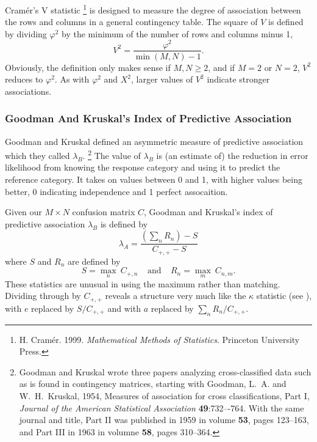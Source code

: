 Cramér's V statistic%
%
\footnote{H. Cramér. 1999. {\it Mathematical Methods of
    Statistics}. Princeton University Press.}
%
is designed to measure the degree of association between the
rows and columns in a general contingency table.   The square of
$V$ is defined by dividing $\varphi^2$ by the minimum of the number
of rows and columns minus 1,
%
\begin{equation}
V^2 = \frac{\varphi^2}{\min(M,N)-1}.
\end{equation}
%
Obviously, the definition only makes sense if $M,N \geq 2$, and if
$M=2$ or $N=2$, $V^2$ reduces to $\varphi^2$.  As with $\varphi^2$ and
$X^2$, larger values of $V^2$ indicate stronger associations.

\subsubsection{Goodman And Kruskal's Index of Predictive Association}

Goodman and Kruskal defined an asymmetric measure of predictive
association which they called $\lambda_B$.%
%
\footnote{Goodman and Kruskal wrote three papers analyzing
  cross-classified data such as is found in contingency matrices,
  starting with Goodman, L.~A. and W.~H.~Kruskal, 1954, Measures of
  association for cross classifications, Part I, {\it Journal of the
    American Statistical Association} {\bf 49}:732–-764.  With the
  same journal and title, Part II was
  published in 1959 in volume {\bf 53}, pages 123--163, and Part III
  in 1963 in volumne {\bf 58}, pages 310--364.}
%
The value of $\lambda_B$ is (an estimate of) the reduction in error
likelihood from knowing the response category and using it to predict
the reference category.  It takes on values between 0 and 1, with
higher values being better, 0 indicating independence and 1 perfect
assocaition.  

Given our $M \times N$ confusion matrix $C$, Goodman and Kruskal's
index of predictive association $\lambda_B$ is defined by
%
\begin{equation}
\lambda_A 
= \frac{\left(\sum_n R_n\right) - S}
       {C_{+,+} - S}
\end{equation}
%
where $S$ and $R_n$ are defined by 
%
\begin{equation}
S = \max_n \ C_{+,n}
\ \ \ \ \ \mbox{and} \ \ \ \ \
R_n = \max_m \ C_{n,m}.
\end{equation}
%
These statistics are unusual in using the maximum rather than
matching.  Dividing through by $C_{+,+}$ reveals a structure very much
like the $\kappa$ statistic (see \refsec{stats-kappa}), with $e$
replaced by $S/C_{+,+}$ and with $a$ replaced by $\sum_n R_n /
C_{+,+}$.

